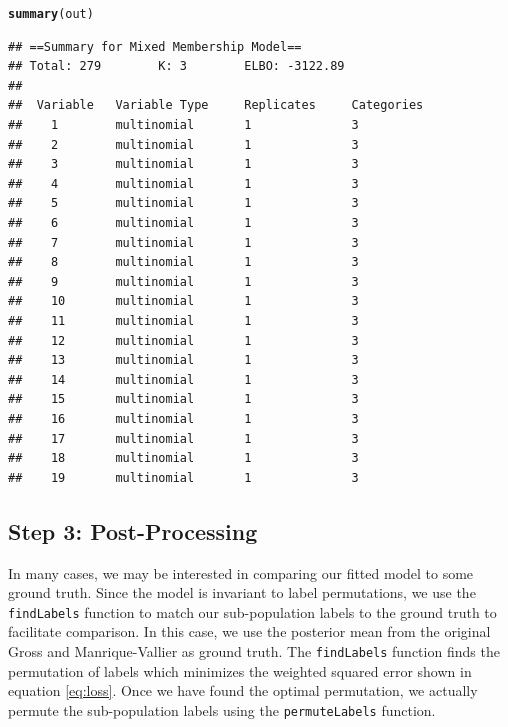 \documentclass{article}\usepackage[]{graphicx}\usepackage[]{color}
\makeatletter
\newcommand{\hlstd}[1]{\textcolor[rgb]{0.345,0.345,0.345}{#1}}%
\newcommand{\hlkwd}[1]{\textcolor[rgb]{0.737,0.353,0.396}{\textbf{#1}}}%
\newenvironment{kframe}{%
 \def\at@end@of@kframe{}%
 \ifinner\ifhmode%
  \def\at@end@of@kframe{\end{minipage}}%
  \begin{minipage}{\columnwidth}%
 \fi\fi%
 \def\FrameCommand##1{\hskip\@totalleftmargin \hskip-\fboxsep
 \colorbox{shadecolor}{##1}\hskip-\fboxsep
     \hskip-\linewidth \hskip-\@totalleftmargin \hskip\columnwidth}%
 \MakeFramed {\advance\hsize-\width
   \@totalleftmargin\z@ \linewidth\hsize
   \@setminipage}}%
 {\par\unskip\endMakeFramed%
 \at@end@of@kframe}
\newenvironment{knitrout}{}{} %
\renewenvironment{knitrout}{\begin{singlespace}}{\end{singlespace}}
\makeatother
\begin{document}
\begin{knitrout}
\color{fgcolor}\begin{kframe}
\begin{alltt}
\hlkwd{summary}\hlstd{(out)}
\end{alltt}
\begin{verbatim}
## ==Summary for Mixed Membership Model==
## Total: 279		 K: 3		 ELBO: -3122.89
## 
##  Variable   Variable Type     Replicates     Categories  
##    1        multinomial       1              3           
##    2        multinomial       1              3           
##    3        multinomial       1              3           
##    4        multinomial       1              3           
##    5        multinomial       1              3           
##    6        multinomial       1              3           
##    7        multinomial       1              3           
##    8        multinomial       1              3           
##    9        multinomial       1              3           
##    10       multinomial       1              3           
##    11       multinomial       1              3           
##    12       multinomial       1              3           
##    13       multinomial       1              3           
##    14       multinomial       1              3           
##    15       multinomial       1              3           
##    16       multinomial       1              3           
##    17       multinomial       1              3           
##    18       multinomial       1              3           
##    19       multinomial       1              3
\end{verbatim}
\end{kframe}
\end{knitrout}

\subsection*{Step 3: Post-Processing}
In many cases, we may be interested in comparing our fitted model to some ground truth. Since the model is invariant to label permutations, we use the \texttt{findLabels} function to match our sub-population labels to the ground truth to facilitate comparison. In this case, we use the posterior mean from the original Gross and Manrique-Vallier as ground truth. The \texttt{findLabels} function finds the permutation of labels which minimizes the weighted squared error shown in equation \ref{eq:loss}. Once we have found the optimal permutation, we actually permute the sub-population labels using the \texttt{permuteLabels} function. 
\end{document}
